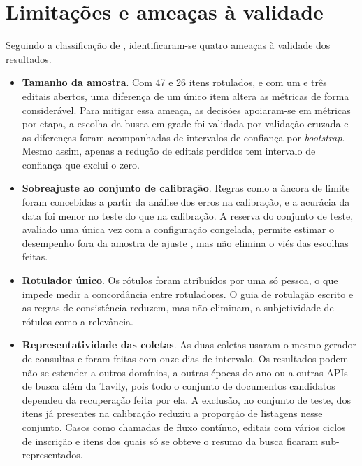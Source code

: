 \section{Limitações e ameaças à validade}
\label{sec:ameacas}

Seguindo a classificação de , identificaram-se
quatro ameaças à validade dos resultados.

\begin{itemize}
  \item \textbf{Tamanho da amostra}. Com 47 e 26 itens rotulados, e com um e
    três editais abertos, uma diferença de um único item altera as métricas de
    forma considerável. Para mitigar essa ameaça, as decisões apoiaram-se em
    métricas por etapa, a escolha da busca em grade foi validada por validação
    cruzada e as diferenças foram acompanhadas de intervalos de confiança por
    \textit{bootstrap}. Mesmo assim, apenas a redução de editais perdidos tem
    intervalo de confiança que exclui o zero.
  \item \textbf{Sobreajuste ao conjunto de calibração}. Regras como a âncora de
    limite foram concebidas a partir da análise dos erros na calibração, e a
    acurácia da data foi menor no teste do que na calibração. A reserva do
    conjunto de teste, avaliado uma única vez com a configuração congelada,
    permite estimar o desempenho fora da amostra de ajuste \cite{cawley2010},
    mas não elimina o viés das escolhas feitas.
  \item \textbf{Rotulador único}. Os rótulos foram atribuídos por uma só pessoa,
    o que impede medir a concordância entre rotuladores. O guia de rotulação
    escrito e as regras de consistência reduzem, mas não eliminam, a
    subjetividade de rótulos como a relevância.
  \item \textbf{Representatividade das coletas}. As duas coletas usaram o mesmo
    gerador de consultas e foram feitas com onze dias de intervalo. Os
    resultados podem não se estender a outros domínios, a outras épocas do ano
    ou a outras APIs de busca além da Tavily, pois todo o conjunto de
    documentos candidatos dependeu da recuperação feita por ela. A exclusão, no conjunto de teste, dos itens já presentes
    na calibração reduziu a proporção de listagens nesse conjunto. Casos como
    chamadas de fluxo contínuo, editais com vários ciclos de inscrição e itens
    dos quais só se obteve o resumo da busca ficaram sub-representados.
\end{itemize}

